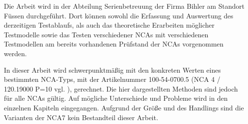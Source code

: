Die Arbeit wird in der Abteilung Serienbetreuung der Firma Bihler am Standort Füssen durchgeführt. Dort können sowohl die Erfassung und Auswertung des derzeitigen Testablaufs, als auch das theoretische Erarbeiten  möglicher Testmodelle sowie das Testen verschiedener NCAs mit verschiedenen Testmodellen am bereits vorhandenen Prüfstand der NCAs vorgenommen werden.


In dieser Arbeit wird schwerpunktmäßig mit den konkreten Werten eines bestimmten NCA-Typs, mit der Artikelnummer 100-54-0700.5 (NCA 4 / 120.19000 P=10 vgl. \cite{Riedle2015}), gerechnet. Die hier dargestellten Methoden sind jedoch für alle NCAs gültig. Auf mögliche Unterschiede und Probleme wird in den einzelnen Kapiteln eingegangen. Aufgrund der Größe und des Handlings sind die Varianten der NCA7 kein Bestandteil dieser Arbeit.








